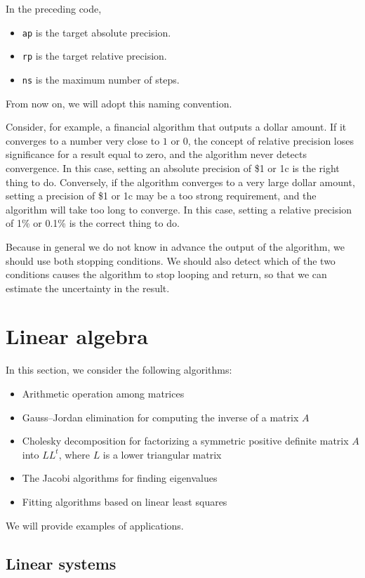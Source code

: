 \documentclass[justified, sixbynine]{tufte-book}
\def\ft{\small\tt}
\theoremstyle{plain}%
\newtheorem * {corollary}{Corollary}
\theoremstyle{definition}
\theoremstyle{remark}
\newtheorem * {remark}{Remark}
\newtheorem * {note}{Note}
\begin{document}
\begin{fullwidth}
In the preceding code, 
\begin{itemize}
\item {\ft ap} is the target absolute precision.
\item {\ft rp} is the target relative precision.
\item {\ft ns} is the maximum number of steps.
\end{itemize}
From now on, we will adopt this naming convention.


Consider, for example, a financial algorithm that outputs a dollar amount. If it converges to a number very close to $1$ or $0$, the concept of relative precision loses significance for a result equal to zero, and the algorithm never detects convergence. In this case, setting an absolute precision of \$1 or 1c is the right thing to do. Conversely, if the algorithm converges to a very large dollar amount, setting a precision of \$1 or 1c may be a too strong requirement, and the algorithm will take too long to converge. In this case, setting a relative precision of 1\% or 0.1\% is the correct thing to do.

 Because in general we do not know in advance the output of the algorithm, we should use both stopping conditions. We should also detect which of the two conditions causes the algorithm to stop looping and return, so that we can estimate the uncertainty in the result.

\goodbreak\section{Linear algebra}


In this section, we consider the following algorithms:
\begin{itemize}
\item Arithmetic operation among matrices
\item Gauss--Jordan elimination for computing the inverse of a matrix $A$
\item Cholesky decomposition for factorizing a symmetric positive definite matrix $A$ into $L L^t$, where $L$ is a lower triangular matrix
\item The Jacobi algorithms for finding eigenvalues
\item Fitting algorithms based on linear least squares
\end{itemize}
We will provide examples of applications.

\goodbreak\subsection{Linear systems}


\end{fullwidth}
\end{document}
